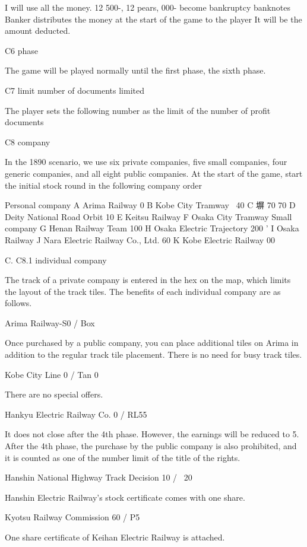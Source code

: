 \documentclass{article}
\begin{document}
\begin{CJK}{UTF8}{min}
I will use all the money. 12 500-, 12 pears, 000- become bankruptcy banknotes Banker distributes the money at the start of the game to the player It will be the amount deducted.

C6 phase

The game will be played normally until the first phase, the sixth phase.

C7 limit number of documents limited

The player sets the following number as the limit of the number of profit documents

C8 company

In the 1890 scenario, we use six private companies, five small companies, four generic companies, and all eight public companies. At the start of the game, start the initial stock round in the following company order

Personal company
A Arima Railway 0
B Kobe City Tramway \ 40
C 塀 70 70
D Deity National Road Orbit 10
E Keitsu Railway 
F Osaka City Tramway 
Small company
G Henan Railway Team 100
H Osaka Electric Trajectory 200 '
I Osaka Railway 
J Nara Electric Railway Co., Ltd. 60
K Kobe Electric Railway 00

C. C8.1 individual company

The track of a private company is entered in the hex on the map, which limits the layout of the track tiles. The benefits of each individual company are as follows.

Arima Railway-S0 / Box

Once purchased by a public company, you can place additional tiles on Arima in addition to the regular track tile placement. There is no need for busy track tiles.

Kobe City Line 0 / Tan 0

There are no special offers.

Hankyu Electric Railway Co. 0 / RL55

It does not close after the 4th phase. However, the earnings will be reduced to 5. After the 4th phase, the purchase by the public company is also prohibited, and it is counted as one of the number limit of the title of the rights.

Hanshin National Highway Track Decision 10 / \ 20

Hanshin Electric Railway's stock certificate comes with one share.

Kyotsu Railway Commission 60 / P5

One share certificate of Keihan Electric Railway is attached.


\end{CJK}
\end{document}
